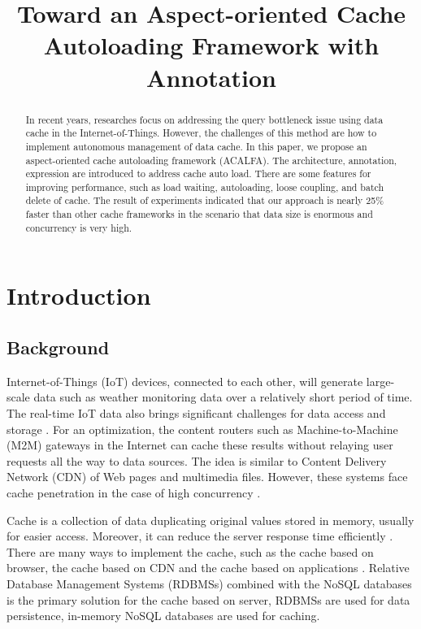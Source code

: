 \documentclass{singlecol-new}
\theoremstyle{TH}{
\newtheorem{lemma}{Lemma}
\newtheorem{theorem}[lemma]{Theorem}
\newtheorem{corrolary}[lemma]{Corrolary}
\newtheorem{conjecture}[lemma]{Conjecture}
\newtheorem{proposition}[lemma]{Proposition}
\newtheorem{claim}[lemma]{Claim}
\newtheorem{stheorem}[lemma]{Wrong Theorem}
}
\theoremstyle{THrm}{
\newtheorem{definition}{Definition}[section]
\newtheorem{question}{Question}[section]
\newtheorem{remark}{Remark}
\newtheorem{scheme}{Scheme}
}
\theoremstyle{THhit}{
\newtheorem{case}{Case}[section]
}
\begin{document}
%

\title{Toward an Aspect-oriented Cache Autoloading Framework with Annotation}

\begin{abstract}
In recent years, researches focus on addressing the query bottleneck issue using data cache in the Internet-of-Things. However, the challenges of this method are how to implement autonomous management of data cache. In this paper, we propose an aspect-oriented cache autoloading framework (ACALFA). The architecture, annotation, expression are introduced to address cache auto load. There are some features for improving performance, such as load waiting, autoloading, loose coupling, and batch delete of cache. The result of experiments indicated that our approach is nearly 25\% faster than other cache frameworks in the scenario that data size is enormous and concurrency is very high.
\end{abstract}


\maketitle


\section{Introduction}
\label{Introduction}

\subsection{Background}
Internet-of-Things (IoT) \cite{zanella2014internet} devices, connected to each other, will generate large-scale data such as weather monitoring data over a relatively short period of time. The real-time IoT data also brings significant challenges for data access and storage \cite{kaisler2013big}. For an optimization, the content routers such as Machine-to-Machine (M2M) gateways in the Internet can cache these results without relaying user requests all the way to data sources. The idea is similar to Content Delivery Network (CDN) of Web pages and multimedia files. However, these systems face cache penetration in the case of high concurrency \cite{nishtala2013scaling}.

Cache is a collection of data duplicating original values stored in memory, usually for easier access. Moreover, it can reduce the server response time efficiently \cite{ma2017segment}. There are many ways to implement the cache, such as the cache based on browser, the cache based on CDN \cite{manjhi2005finding} and the cache based on applications \cite{wu2011characterization}. Relative Database Management Systems (RDBMSs) combined with the NoSQL databases is the primary solution for the cache based on server, RDBMSs are used for data persistence, in-memory NoSQL databases are used for caching.
\end{document}
